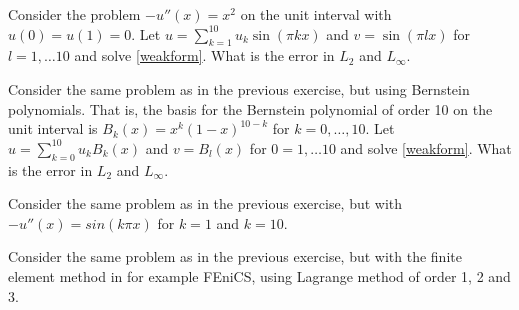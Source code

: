 \begin{exercise}
Consider the problem $-u''(x) = x^2$ on the unit interval with $u(0) = u(1) = 0$.  
Let $u=\sum_{k=1}^{10} u_k \sin(\pi k x )$ and $v=\sin(\pi l x)$ for $l=1, \ldots 10$
and solve \eqref{weakform}. What is the error in $L_2$ and $L_\infty$.  
\end{exercise}

\begin{exercise}
Consider the same problem as in the previous exercise, but using Bernstein polynomials. 
That is, the basis for the Bernstein polynomial of order 10 on the unit interval is $B_k(x)=x^k(1-x)^{10-k}$ for $k=0, \ldots, 10$.  
Let $u=\sum_{k=0}^{10} u_k B_k(x )$ and $v=B_l(x)$ for $0=1, \ldots 10$
and solve \eqref{weakform}. What is the error in $L_2$ and $L_\infty$.  
\end{exercise}

\begin{exercise}
Consider the same problem as in the previous exercise, but with  
$-u''(x) = sin(k \pi x)$ for $k=1$ and $k=10$.  
\end{exercise}

\begin{exercise}
Consider the same problem as in the previous exercise, but
with the finite element method in for example FEniCS, using Lagrange 
method of order 1, 2 and 3. 

\end{exercise}











